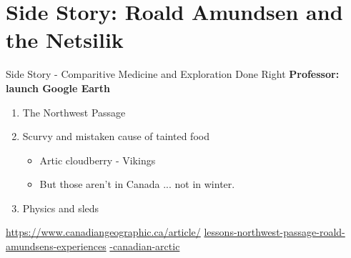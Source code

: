 \documentclass{beamer}
\begin{document}
\section{Side Story: Roald Amundsen and the Netsilik}

\begin{frame}{Side Story - Comparitive Medicine and Exploration Done Right}
\small
\textbf{Professor: launch Google Earth}
\begin{enumerate}
\item The Northwest Passage
\item Scurvy and mistaken cause of tainted food
\begin{itemize}
\item Artic cloudberry - Vikings
\item But those aren't in Canada ... not in winter.
\end{itemize}
\item Physics and sleds
\end{enumerate}
\url{https://www.canadiangeographic.ca/article/}
\url{lessons-northwest-passage-roald-amundsens-experiences}
\url{-canadian-arctic}
\end{frame}
\end{document}
